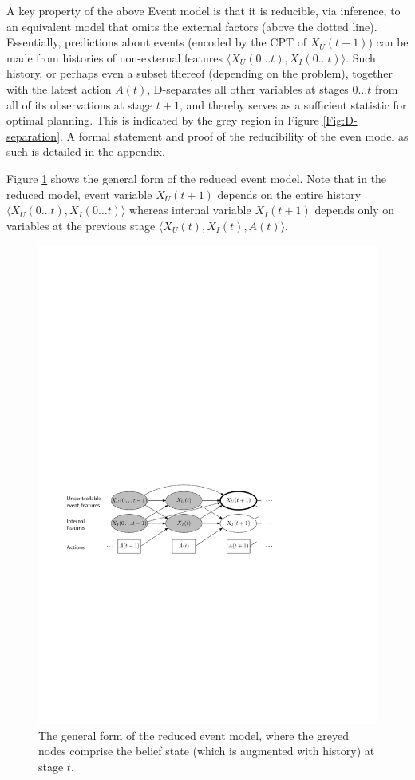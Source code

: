 \documentclass[10pt]{article}
\begin{document}
A key property of the above Event model is that it is reducible, via inference, to an equivalent model that omits the external factors (above the dotted line).  Essentially, predictions about events (encoded by the CPT of $X_U(t\!+\!1)$) can be made from histories of non-external features $\langle X_U(0\ldots t), X_I(0\ldots t) \rangle$.  Such history, or perhaps even a subset thereof (depending on the problem), together with the latest action $A(t)$, D-separates all other variables at stages $0\ldots t$ from all of its observations at stage $t+1$, and thereby serves as a sufficient statistic for optimal planning.  This is indicated by the grey region in Figure \ref{Fig:D-separation}.  A formal statement and proof of the reducibility of the even model as such is detailed in the appendix.

Figure \ref{Fig:reduced-model} shows the general form of the reduced event model.  Note that in the reduced model, event variable $X_U(t+1)$ depends on the entire history $\langle X_U(0\ldots t), X_I(0\ldots t) \rangle$ whereas internal variable $X_I(t+1)$ depends only on variables at the previous stage $\langle X_U(t), X_I(t), A(t) \rangle$.

\begin{figure}[h]%
\centering
  \includegraphics[width=\columnwidth]{bayes-reduced}
\caption{The general form of the reduced event model, where the greyed nodes comprise the belief state (which is augmented with history) at stage $t$.}
  \label{Fig:reduced-model}
\end{figure}
\end{document}
